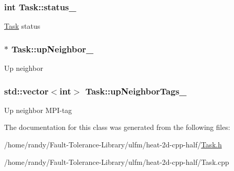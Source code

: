 \subsubsection[{\texorpdfstring{status\+\_\+}{status_}}]{\setlength{\rightskip}{0pt plus 5cm}int Task\+::status\+\_\+\hspace{0.3cm}{\ttfamily [private]}}\hypertarget{classTask_a96652c5f54a8104340907cad3502c175}{}\label{classTask_a96652c5f54a8104340907cad3502c175}
\hyperlink{classTask}{Task} status 
\subsubsection[{\texorpdfstring{up\+Neighbor\+\_\+}{upNeighbor_}}]{$\ast$ Task\+::up\+Neighbor\+\_\+\hspace{0.3cm}{\ttfamily [private]}}\hypertarget{classTask_afb2ba19e810d01148e7a125e14ce755c}{}\label{classTask_afb2ba19e810d01148e7a125e14ce755c}
Up neighbor 
\subsubsection[{\texorpdfstring{up\+Neighbor\+Tags\+\_\+}{upNeighborTags_}}]{\setlength{\rightskip}{0pt plus 5cm}std\+::vector$<$int$>$ Task\+::up\+Neighbor\+Tags\+\_\+\hspace{0.3cm}{\ttfamily [private]}}\hypertarget{classTask_ac143013d3e48eddf3aab992077c5d05a}{}\label{classTask_ac143013d3e48eddf3aab992077c5d05a}
Up neighbor M\+P\+I-\/tag 

The documentation for this class was generated from the following files\+:\begin{DoxyCompactItemize}
\item 
/home/randy/\+Fault-\/\+Tolerance-\/\+Library/ulfm/heat-\/2d-\/cpp-\/half/\hyperlink{Task_8h}{Task.\+h}\item 
/home/randy/\+Fault-\/\+Tolerance-\/\+Library/ulfm/heat-\/2d-\/cpp-\/half/Task.\+cpp\end{DoxyCompactItemize}
